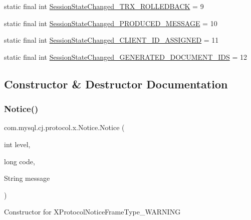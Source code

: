 \begin{DoxyCompactItemize}
\item 
static final int \mbox{\hyperlink{classcom_1_1mysql_1_1cj_1_1protocol_1_1x_1_1_notice_a04d7d0e0746f3a7e710ef42ec6dc8701}{Session\+State\+Changed\+\_\+\+T\+R\+X\+\_\+\+R\+O\+L\+L\+E\+D\+B\+A\+CK}} = 9
\item 
static final int \mbox{\hyperlink{classcom_1_1mysql_1_1cj_1_1protocol_1_1x_1_1_notice_a3c15e1f4d0d1803a27f1e77f80837c66}{Session\+State\+Changed\+\_\+\+P\+R\+O\+D\+U\+C\+E\+D\+\_\+\+M\+E\+S\+S\+A\+GE}} = 10
\item 
static final int \mbox{\hyperlink{classcom_1_1mysql_1_1cj_1_1protocol_1_1x_1_1_notice_a09fa5be11cb450729df25e5cc2d9636e}{Session\+State\+Changed\+\_\+\+C\+L\+I\+E\+N\+T\+\_\+\+I\+D\+\_\+\+A\+S\+S\+I\+G\+N\+ED}} = 11
\item 
static final int \mbox{\hyperlink{classcom_1_1mysql_1_1cj_1_1protocol_1_1x_1_1_notice_a1ec8eb7c0785d9b153926c2287a24549}{Session\+State\+Changed\+\_\+\+G\+E\+N\+E\+R\+A\+T\+E\+D\+\_\+\+D\+O\+C\+U\+M\+E\+N\+T\+\_\+\+I\+DS}} = 12
\end{DoxyCompactItemize}


\subsection{Constructor \& Destructor Documentation}
\mbox{\label{classcom_1_1mysql_1_1cj_1_1protocol_1_1x_1_1_notice_a393f2c56e3f27bd7886c20c5d0b112c6}} 
\subsubsection{\texorpdfstring{Notice()}{Notice()}\hspace{0.1cm}{\footnotesize\ttfamily [1/3]}}
{\footnotesize\ttfamily com.\+mysql.\+cj.\+protocol.\+x.\+Notice.\+Notice (\begin{DoxyParamCaption}\item[{int}]{level,  }\item[{long}]{code,  }\item[{String}]{message }\end{DoxyParamCaption})}

Constructor for X\+Protocol\+Notice\+Frame\+Type\+\_\+\+W\+A\+R\+N\+I\+NG


